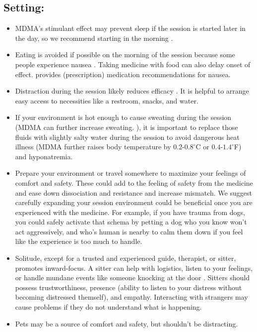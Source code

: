 \documentclass[12pt,letterpaper]{book}
\begin{document}
\subsection*{Setting:}
\begin{itemize}
    \item MDMA's stimulant effect may prevent sleep if the session is started later in the day, so we recommend starting in the morning \cite{berro2018acute}.
    \item Eating is avoided if possible on the morning of the session because some people experience nausea \cite{colcott2024side}. Taking medicine with food can also delay onset of effect. \textcite{liechtiInteractions} provides (prescription) medication recommendations for nausea.
    \item Distraction during the session likely reduces efficacy \cite{roseman2024interrupting}. It is helpful to arrange easy access to necessities like a restroom, snacks, and water.
    \item If your environment is hot enough to cause sweating during the session (MDMA can further increase sweating. \cite{colcott2024side}), it is important to replace those fluids with slightly salty water during the session to avoid dangerous heat illness (MDMA further raises body temperature by $0.2$-$0.8^{\circ}$C or $0.4$-$1.4^{\circ}$F\cite{liechti2014effects}) and hyponatremia.
    \label{contextexpansion}
    \item Prepare your environment or travel somewhere to maximize your feelings of comfort and safety. These could add to the feeling of safety from the medicine and ease down dissociation and resistance and increase mismatch. We suggest carefully expanding your session environment could be beneficial once you are experienced with the medicine. For example, if you have trauma from dogs, you could safely activate that schema by petting a dog who you know won't act aggressively, and who's human is nearby to calm them down if you feel like the experience is too much to handle.
    \label{def:sitter}
    \item Solitude, except for a trusted and experienced guide, therapist, or sitter, promotes inward-focus. A sitter can help with logistics, listen to your feelings, or handle mundane events like someone knocking at the door \cite{thalSitter}. Sitters should possess trustworthiness, presence (ability to listen to your distress without becoming distressed themself), and empathy. Interacting with strangers may cause problems if they do not understand what is happening. 
    \item Pets may be a source of comfort and safety, but shouldn't be distracting.
\end{itemize}
\end{document}
